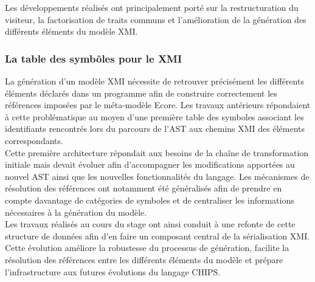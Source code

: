 Les développements réalisés ont principalement porté sur la restructuration du visiteur, la factorisation de traits communs et l'amélioration de la génération des différents éléments du modèle XMI. \\

\subsubsection{La table des symbôles pour le XMI}
\label{sec:table_symbole_XMI}

La génération d'un modèle XMI nécessite de retrouver précisément les différents éléments déclarés dans un programme afin de construire correctement les références imposées par le méta-modèle Ecore. Les travaux antérieurs répondaient à cette problématique au moyen d'une première table des symboles associant les identifiants rencontrés lors du parcours de l'AST aux chemins XMI des éléments correspondants. \\ %

Cette première architecture répondait aux besoins de la chaîne de transformation initiale mais devait évoluer afin d'accompagner les modifications apportées au nouvel AST ainsi que les nouvelles fonctionnalités du langage. Les mécanismes de résolution des références ont notamment été généralisés afin de prendre en compte davantage de catégories de symboles et de centraliser les informations nécessaires à la génération du modèle. \\

Les travaux réalisés au cours du stage ont ainsi conduit à une refonte de cette structure de données afin d'en faire un composant central de la sérialisation XMI. Cette évolution améliore la robustesse du processus de génération, facilite la résolution des références entre les différents éléments du modèle et prépare l'infrastructure aux futures évolutions du langage CHIPS. \\

\FloatBarrier

\newpage